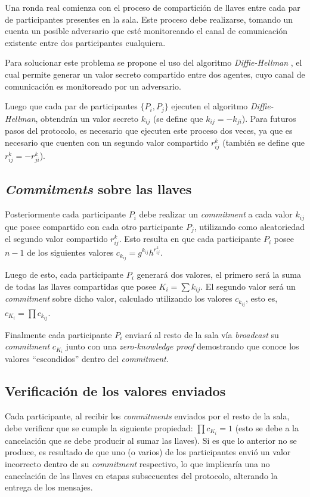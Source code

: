 Una ronda real comienza con el proceso de compartición de llaves entre cada 
par de participantes presentes en la sala. Este proceso debe realizarse, 
tomando un cuenta un posible adversario que esté monitoreando el canal de 
comunicación existente entre dos participantes cualquiera.

Para solucionar este problema se propone el uso del algoritmo 
\emph{Diffie-Hellman} \cite{diffie1976new}, el cual permite generar un valor 
secreto compartido entre dos agentes, cuyo canal de comunicación es 
monitoreado por un adversario.

Luego que cada par de participantes $\{P_i, P_j\}$ ejecuten el algoritmo 
\emph{Diffie-Hellman}, obtendrán un valor secreto $k_{ij}$ (se define que $k_{ij} = -k_{ji}$). 
Para futuros pasos 
del protocolo, es necesario que ejecuten este proceso dos veces, ya que es 
necesario que cuenten con un segundo valor compartido $r^k_{ij}$ (también se define 
que $r^k_{ij} = -r^k_{ji}$).

\subsection{\emph{Commitments} sobre las llaves}

Posteriormente cada participante $P_i$ debe realizar un \emph{commitment} a 
cada valor $k_{ij}$ que posee compartido con cada otro participante $P_j$, 
utilizando como aleatoriedad el segundo valor compartido $r^k_{ij}$. Esto 
resulta en que cada participante $P_i$ posee $n - 1$ de los siguientes valores 
$c_{k_{ij}} = g^{k_{ij}} h^{r^k_{ij}}$.

Luego de esto, cada participante $P_i$ generará dos valores, el primero será 
la suma de todas las llaves compartidas que posee $K_i = \sum k_{ij}$. El 
segundo valor será un \emph{commitment} sobre dicho valor, calculado utilizando 
los valores $c_{k_{ij}}$, esto es, 
$c_{K_i} = \prod c_{k_{ij}}$.

Finalmente cada participante $P_i$ enviará al resto de la sala vía 
\emph{broadcast} su \emph{commitment} $c_{K_i}$ junto con una 
\emph{zero-knowledge proof} demostrando que conoce los valores ``escondidos'' 
dentro del \emph{commitment}.

\subsection{Verificación de los valores enviados}

Cada participante, al recibir los \emph{commitments} enviados por el resto de la 
sala, debe verificar que se cumple la siguiente propiedad: $\prod c_{K_i} = 1$ 
(esto se debe a la cancelación que se debe producir al sumar las llaves). Si es que 
lo anterior no se produce, es resultado de que uno (o varios) de los participantes envió un 
valor incorrecto dentro de su \emph{commitment} respectivo, lo que implicaría una 
no cancelación de las llaves en etapas subsecuentes del protocolo, alterando la entrega 
de los mensajes.

